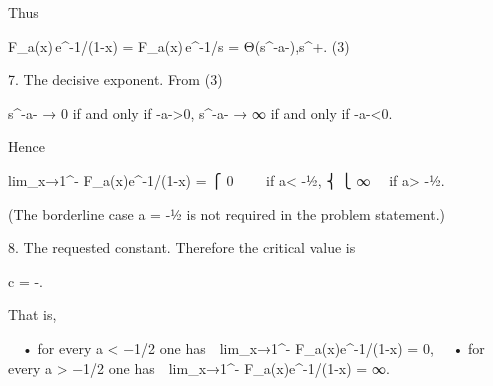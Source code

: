    Thus

       F_a(x)\,e^{-1/(1-x)} = F_a(x)\,e^{-1/s}
              = Θ\!\bigl(s^{-a-}\bigr),\qquad s^{+}.       (3)

7.  The decisive exponent.  
   From (3)

          s^{-a-}  →  0     if and only if     -a->0,
          s^{-a-}  →  ∞    if and only if     -a-<0.

   Hence

          lim_{x→1^-} F_a(x)e^{-1/(1-x)} =
          ⎧ 0   if a< -½,
          ⎨
          ⎩ ∞   if a> -½.

(The borderline case a = -½ is not required in the problem statement.)

8.  The requested constant.  
   Therefore the critical value is  

          c = -.

That is,

 • for every a < −1/2 one has lim_{x→1^-} F_a(x)e^{-1/(1-x)} = 0,  
 • for every a > −1/2 one has lim_{x→1^-} F_a(x)e^{-1/(1-x)} = ∞.